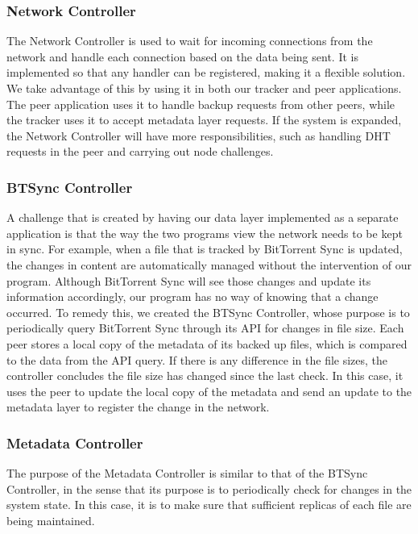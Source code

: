\documentclass[12pt]{report}
\begin{document}
\subsubsection{Network Controller} \label{subsubsec:NetworkController_subsec:SystemCore_sec:SystemDesign_chap:Implementation}
The Network Controller is used to wait for incoming connections from the network and handle each connection based on the data being sent. It is implemented so that any handler can be registered, making it a flexible solution. We take advantage of this by using it in both our tracker and peer applications. The peer application uses it to handle backup requests from other peers, while the tracker uses it to accept metadata layer requests. If the system is expanded, the Network Controller will have more responsibilities, such as handling DHT requests in the peer and carrying out node challenges.

\subsubsection{BTSync Controller} \label{subsubsec:BTSyncController_subsec:SystemCore_sec:SystemDesign_chap:Implementation}
A challenge that is created by having our data layer implemented as a separate application is that the way the two programs view the network needs to be kept in sync. For example, when a file that is tracked by BitTorrent Sync is updated, the changes in content are automatically managed without the intervention of our program. Although BitTorrent Sync will see those changes and update its information accordingly, our program has no way of knowing that a change occurred. To remedy this, we created the BTSync Controller, whose purpose is to periodically query BitTorrent Sync through its API for changes in file size. Each peer stores a local copy of the metadata of its backed up files, which is compared to the data from the API query. If there is any difference in the file sizes, the controller concludes the file size has changed since the last check. In this case, it uses the peer to update the local copy of the metadata and send an update to the metadata layer to register the change in the network.

\subsubsection{Metadata Controller} \label{subsubsec:MetadataController_subsec:SystemCore_sec:SystemDesign_chap:Implementation}
The purpose of the Metadata Controller is similar to that of the BTSync Controller, in the sense that its purpose is to periodically check for changes in the system state. In this case, it is to make sure that sufficient replicas of each file are being maintained.
\end{document}
